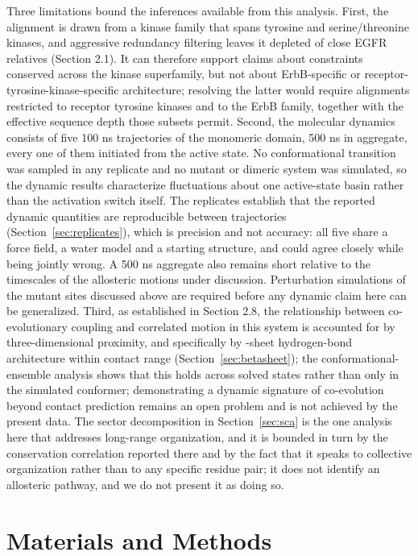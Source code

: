 \documentclass[utf8]{FrontiersinHarvard}
\begin{document}
Three limitations bound the inferences available from this analysis. First, the alignment is drawn from a kinase family that spans tyrosine and serine/threonine kinases, and aggressive redundancy filtering leaves it depleted of close EGFR relatives (Section 2.1). It can therefore support claims about constraints conserved across the kinase superfamily, but not about ErbB-specific or receptor-tyrosine-kinase-specific architecture; resolving the latter would require alignments restricted to receptor tyrosine kinases and to the ErbB family, together with the effective sequence depth those subsets permit. Second, the molecular dynamics consists of five 100 ns trajectories of the monomeric domain, 500 ns in aggregate, every one of them initiated from the active state. No conformational transition was sampled in any replicate and no mutant or dimeric system was simulated, so the dynamic results characterize fluctuations about one active-state basin rather than the activation switch itself. The replicates establish that the reported dynamic quantities are reproducible between trajectories (Section~\ref{sec:replicates}), which is precision and not accuracy: all five share a force field, a water model and a starting structure, and could agree closely while being jointly wrong. A 500 ns aggregate also remains short relative to the timescales of the allosteric motions under discussion. Perturbation simulations of the mutant sites discussed above are required before any dynamic claim here can be generalized. Third, as established in Section 2.8, the relationship between co-evolutionary coupling and correlated motion in this system is accounted for by three-dimensional proximity, and specifically by \textbeta{}-sheet hydrogen-bond architecture within contact range (Section~\ref{sec:betasheet}); the conformational-ensemble analysis shows that this holds across solved states rather than only in the simulated conformer; demonstrating a dynamic signature of co-evolution beyond contact prediction remains an open problem and is not achieved by the present data. The sector decomposition in Section~\ref{sec:sca} is the one analysis here that addresses long-range organization, and it is bounded in turn by the conservation correlation reported there and by the fact that it speaks to collective organization rather than to any specific residue pair; it does not identify an allosteric pathway, and we do not present it as doing so.

\section{Materials and Methods}
\end{document}
